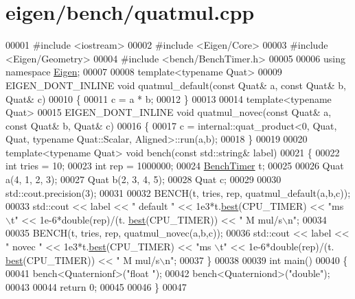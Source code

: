 \hypertarget{eigen_2bench_2quatmul_8cpp_source}{}\section{eigen/bench/quatmul.cpp}
\label{eigen_2bench_2quatmul_8cpp_source}

\begin{DoxyCode}
00001 \textcolor{preprocessor}{#include <iostream>}
00002 \textcolor{preprocessor}{#include <Eigen/Core>}
00003 \textcolor{preprocessor}{#include <Eigen/Geometry>}
00004 \textcolor{preprocessor}{#include <bench/BenchTimer.h>}
00005 
00006 \textcolor{keyword}{using namespace }\hyperlink{namespace_eigen}{Eigen}; 
00007 
00008 \textcolor{keyword}{template}<\textcolor{keyword}{typename} Quat>
00009 EIGEN\_DONT\_INLINE \textcolor{keywordtype}{void} quatmul\_default(\textcolor{keyword}{const} Quat& a, \textcolor{keyword}{const} Quat& b, Quat& c)
00010 \{
00011   c = a * b;
00012 \}
00013 
00014 \textcolor{keyword}{template}<\textcolor{keyword}{typename} Quat>
00015 EIGEN\_DONT\_INLINE \textcolor{keywordtype}{void} quatmul\_novec(\textcolor{keyword}{const} Quat& a, \textcolor{keyword}{const} Quat& b, Quat& c)
00016 \{
00017   c = internal::quat\_product<0, Quat, Quat, typename Quat::Scalar, Aligned>::run(a,b);
00018 \}
00019 
00020 \textcolor{keyword}{template}<\textcolor{keyword}{typename} Quat> \textcolor{keywordtype}{void} bench(\textcolor{keyword}{const} std::string& label)
00021 \{
00022   \textcolor{keywordtype}{int} tries = 10;
00023   \textcolor{keywordtype}{int} rep = 1000000;
00024   \hyperlink{class_eigen_1_1_bench_timer}{BenchTimer} t;
00025   
00026   Quat a(4, 1, 2, 3);
00027   Quat b(2, 3, 4, 5);
00028   Quat c;
00029   
00030   std::cout.precision(3);
00031   
00032   BENCH(t, tries, rep, quatmul\_default(a,b,c));
00033   std::cout << label << \textcolor{stringliteral}{" default "} << 1e3*t.\hyperlink{class_eigen_1_1_bench_timer_ae8b673b0fa356d3432c7a65c79e8af0e}{best}(CPU\_TIMER) << \textcolor{stringliteral}{"ms  \(\backslash\)t"} << 1e-6*double(rep)/(t.
      \hyperlink{class_eigen_1_1_bench_timer_ae8b673b0fa356d3432c7a65c79e8af0e}{best}(CPU\_TIMER)) << \textcolor{stringliteral}{" M mul/s\(\backslash\)n"};
00034   
00035   BENCH(t, tries, rep, quatmul\_novec(a,b,c));
00036   std::cout << label << \textcolor{stringliteral}{" novec   "} << 1e3*t.\hyperlink{class_eigen_1_1_bench_timer_ae8b673b0fa356d3432c7a65c79e8af0e}{best}(CPU\_TIMER) << \textcolor{stringliteral}{"ms  \(\backslash\)t"} << 1e-6*double(rep)/(t.
      \hyperlink{class_eigen_1_1_bench_timer_ae8b673b0fa356d3432c7a65c79e8af0e}{best}(CPU\_TIMER)) << \textcolor{stringliteral}{" M mul/s\(\backslash\)n"};
00037 \}
00038 
00039 \textcolor{keywordtype}{int} main()
00040 \{
00041   bench<Quaternionf>(\textcolor{stringliteral}{"float "});
00042   bench<Quaterniond>(\textcolor{stringliteral}{"double"});
00043 
00044   \textcolor{keywordflow}{return} 0;
00045 
00046 \}
00047 
\end{DoxyCode}
